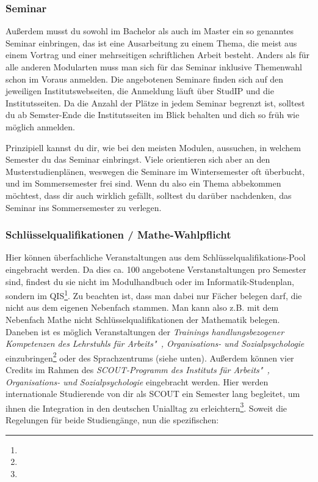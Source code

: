 
	\subsubsection{Seminar}
	Außerdem musst du sowohl im Bachelor als auch im Master ein so genanntes Seminar einbringen, das ist eine Ausarbeitung zu einem Thema, die meist aus einem Vortrag und einer mehrseitigen schriftlichen Arbeit besteht. Anders als für alle anderen Modularten muss man sich für das Seminar inklusive Themenwahl schon im Voraus anmelden. Die angebotenen Seminare finden sich auf den jeweiligen Institutswebseiten, die Anmeldung läuft über StudIP und die Institutsseiten. Da die Anzahl der Plätze in jedem Seminar begrenzt ist, solltest du ab Semster-Ende die Institutsseiten im Blick behalten und dich so früh wie möglich anmelden.

	Prinzipiell kannst du dir, wie bei den meisten Modulen, aussuchen, in welchem Semester du das Seminar einbringst. Viele orientieren sich aber an den Musterstudienplänen, weswegen die Seminare im Wintersemester oft überbucht, und im Sommersemester frei sind. Wenn du also ein Thema abbekommen möchtest, dass dir auch wirklich gefällt, solltest du darüber nachdenken, das Seminar ins Sommersemester zu verlegen.

	\subsubsection{Schlüsselqualifikationen / Mathe-Wahl\-pflicht}
	Hier können überfachliche Veranstaltungen aus dem Schlüsselqualifikations-Pool eingebracht werden. Da dies ca. 100 angebotene Verstanstaltungen pro Semester sind, findest du sie nicht im Modulhandbuch oder im Informatik-Studenplan, sondern im QIS\footnote{}.
	 Zu beachten ist, dass man dabei nur Fächer belegen darf, die nicht aus dem eigenen Nebenfach stammen. Man kann also z.B. mit dem Nebenfach Mathe nicht Schlüsselqualifikationen der Mathematik belegen.
	 Daneben ist es möglich Veranstaltungen der \textit{Trainings handlungsbezogener Kompetenzen des Lehrstuhls für Arbeits"~, Organisations- und Sozialpsychologie} einzubringen\footnote{} oder des Sprachzentrums (siehe unten).
	Außerdem können vier Credits im Rahmen des \textit{SCOUT-Programm des Instituts für Arbeits"~, Organisations- und Sozialpsychologie} eingebracht werden. Hier werden internationale Studierende von dir als SCOUT ein Semester lang begleitet, um ihnen die Integration in den deutschen Unialltag zu erleichtern\footnote{}. Soweit die Regelungen für beide Studiengänge, nun die spezifischen:

